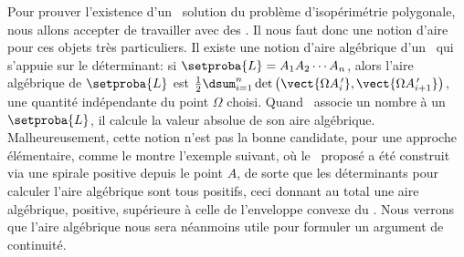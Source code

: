 Pour prouver l'existence d'un \ngone\ solution du problème d'isopérimétrie polygonale, nous allons accepter de travailler avec des \ncycles. Il nous faut donc une notion d'aire pour ces objets très particuliers.  
Il existe une notion d'aire algébrique d'un \ncycle\ qui s'appuie sur le déterminant: si $\setproba{L} = A_1 A_2 \cdots A_n$, alors l'aire algébrique de $\setproba{L}$ est $\frac12 \dsum_{i=1}^{n} \det \big( \vect{\Omega A^{\,\prime}_i} , \vect{\Omega A^{\,\prime}_{i+1}} \big)$, une quantité indépendante du point $\Omega$ choisi.
Quand \geogebra\ associe un nombre à un \ncycle\ $\setproba{L}$, il calcule la valeur absolue de son aire algébrique.
Malheureusement, cette notion n'est pas la bonne candidate, pour une approche élémentaire, comme le montre l'exemple suivant, où le \ncycle\ proposé a été construit via une spirale positive depuis le point $A$, de sorte que les déterminants pour calculer l'aire algébrique sont tous positifs, ceci donnant au total une aire algébrique, positive, supérieure à celle de l'enveloppe convexe du \ncycle.
Nous verrons que l'aire algébrique nous sera néanmoins utile pour formuler un argument de continuité.


